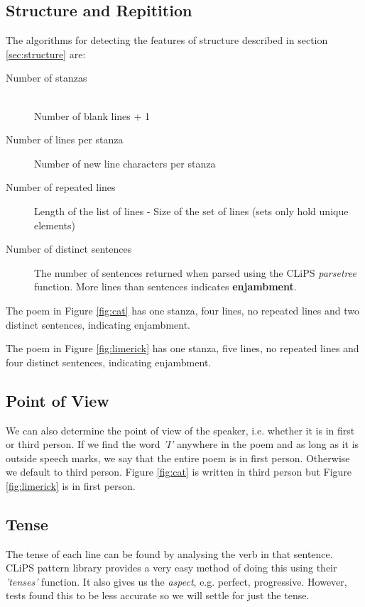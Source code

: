 \subsection{Structure and Repitition}

The algorithms for detecting the features of structure described in section \ref{sec:structure} are:

\begin{description}
\item[Number of stanzas] \hfill \\
Number of blank lines + 1
\item[Number of lines per stanza]
Number of new line characters per stanza
\item[Number of repeated lines]
Length of the list of lines - Size of the set of lines (sets only hold unique elements)
\item[Number of distinct sentences]
The number of sentences returned when parsed using the CLiPS \textit{parsetree} function. More lines than sentences indicates \textbf{enjambment}.
\end{description}

The poem in Figure \ref{fig:cat} has one stanza, four lines, no repeated lines and two distinct sentences, indicating enjambment.

The poem in Figure \ref{fig:limerick} has one stanza, five lines, no repeated lines and four distinct sentences, indicating enjambment.

\subsection{Point of View}

We can also determine the point of view of the speaker, i.e. whether it is in first or third person. If we find the word \textit{'I'} anywhere in the poem and as long as it is outside speech marks, we say that the entire poem is in first person. Otherwise we default to third person. Figure \ref{fig:cat} is written in third person but Figure \ref{fig:limerick} is in first person.

\subsection{Tense}

The tense of each line can be found by analysing the verb in that sentence. CLiPS pattern library provides a very easy method of doing this using their \textit{'tenses'} function. It also gives us the \textit{aspect}, e.g. perfect, progressive. However, tests found this to be less accurate so we will settle for just the tense.

